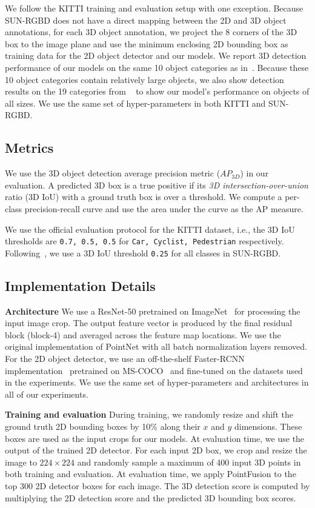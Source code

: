 \documentclass[10pt,twocolumn,letterpaper]{article}
\begin{document}
We follow the KITTI training and evaluation setup with one exception. Because SUN-RGBD does not have a direct mapping between the 2D and 3D object annotations, for each 3D object annotation, we project the 8 corners of the 3D box to the image plane and use the minimum enclosing 2D bounding box as training data for the 2D object detector and our models. We report 3D detection performance of our models on the same 10 object categories as in~\cite{ren2016three,lahoud20172d}. Because these 10 object categories contain relatively large objects, we also show detection results on the 19 categories from ~\cite{song2016deep} to show our model's performance on objects of all sizes. We use the same set of hyper-parameters in both KITTI and SUN-RGBD.


\subsection{Metrics} We use the 3D object detection average precision metric  ($AP_{3D}$) in our evaluation. A predicted 3D box is a true positive if its \textit{3D intersection-over-union} ratio (3D IoU) with a ground truth box is over a threshold. We compute a per-class precision-recall curve and use the area under the curve as the AP measure. 

We use the official evaluation protocol for the KITTI dataset, i.e., the 3D IoU thresholds are \texttt{0.7, 0.5, 0.5} for \texttt{Car, Cyclist, Pedestrian} respectively. Following~\cite{song2015sun,ren2016three,lahoud20172d}, we use a 3D IoU threshold \texttt{0.25} for all classes in SUN-RGBD. 

\subsection{Implementation Details} 
\label{sec:implementation}
\noindent\textbf{Architecture} We use a ResNet-50 pretrained on ImageNet~\cite{imagenet} for processing the input image crop. The output feature vector is produced by the final residual block (block-4) and averaged across the feature map locations. We use the original implementation of PointNet with all batch normalization layers removed. For the 2D object detector, we use an off-the-shelf Faster-RCNN~\cite{ren2015faster} implementation~\cite{tfdetapi} pretrained on MS-COCO~\cite{mscoco} and fine-tuned on the datasets used in the experiments. We use the same set of hyper-parameters and architectures in all of our experiments.

\noindent\textbf{Training and evaluation} During training, we randomly resize and shift the ground truth 2D bounding boxes by 10\% along their $x$ and $y$ dimensions. These boxes are used as the input crops for our models. At evaluation time, we use the output of the trained 2D detector. For each input 2D box, we crop and resize the image to $224 \times 224$ and randomly sample a maximum of 400 input 3D points in both training and evaluation. At evaluation time, we apply PointFusion to the top 300 2D detector boxes for each image. The 3D detection score is computed by multiplying the 2D detection score and the predicted 3D bounding box scores. 
\end{document}
